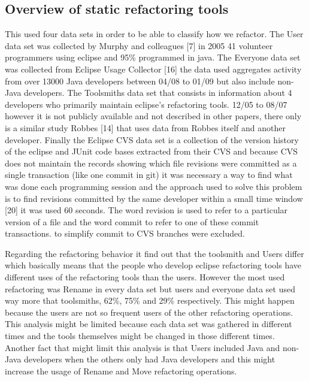 \subsection{Overview of static refactoring tools}
\cite{murphy2012we}
This used four data sets in order to be able to classify how we refactor. The User data set was collected by Murphy and colleagues [7] in 2005 41 volunteer programmers using eclipse and 95\% programmed in java. %
The Everyone data set was collected from Eclipse Usage Collector [16] the data used aggregates activity from over 13000 Java developers between 04/08 to 01/09 but also include non-Java developers. The Toolsmiths data set that consists in information about 4 developers who primarily maintain eclipse's refactoring tools. 12/05 to 08/07 however it is not publicly available and not described in other papers, there only is a similar study Robbes [14] that uses data from Robbes itself and another developer. Finally the Eclipse CVS data set is a collection of the version history of the eclipse and JUnit code bases extracted from their CVS and because CVS does not maintain the records showing which file revisions were committed as a single transaction (like one commit in git) it was necessary a way to find what was done each programming session and the approach used to solve this problem is to find revisions committed by the same developer within a small time window [20] it was used 60 seconds. The word revision is used to refer to a particular version of a file and the word commit to refer to one of these commit transactions. to simplify commit to CVS branches were excluded.


Regarding the refactoring behavior it find out that the toolsmith and Users differ which basically means that the people who develop eclipse refactoring tools have different uses of the refactoring tools than the users. However the most used refactoring was Rename in every data set but users and everyone data set used way more that toolsmiths, 62\%, 75\% and 29\% respectively. This might happen because the users are not so frequent users of the other refactoring operations. This analysis might be limited because each data set was gathered in different times and the tools themselves might be changed in those different times. Another fact that might limit this analysis is that Users included Java and non-Java developers when the others only had Java developers and this might increase the usage of Rename and Move refactoring operations.

